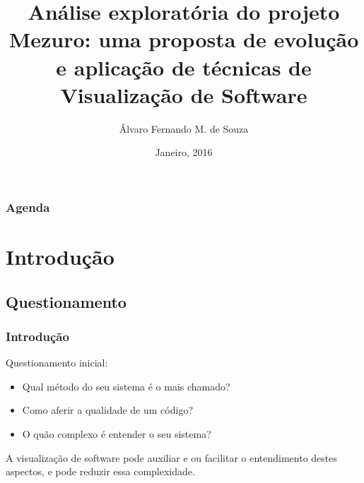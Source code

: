 \documentclass{beamer}
\title[Visualização de Software - Mezuro]{Análise exploratória do projeto
Mezuro: uma proposta de evoluç\~ao e aplicaç\~ao de técnicas de Visualizaç\~ao
de Software}
\author{Álvaro Fernando M. de Souza} %
\institute[UnB-FGA] %
{
Universidade de Brasília - Faculdade Gama \\ %
\medskip
\textit{alvarofernandoms@gmail.com} %
}
\date{Janeiro, 2016} %
\begin{document}
\begin{frame}
\titlepage %
\end{frame}

\begin{frame}
\frametitle{Agenda} %
\tableofcontents %
\end{frame}


\section{Introdução} %

\subsection{Questionamento}

\begin{frame}
\frametitle{Introdução}
Questionamento inicial: \\
\begin{itemize}
\item Qual método do seu sistema é o mais chamado?
\item Como aferir a qualidade de um código?
\item O quão complexo é entender o seu sistema?
\end{itemize}
A visualização de software pode auxiliar e ou facilitar o entendimento destes aspectos, e pode reduzir essa complexidade.
\end{frame}
\end{document}
